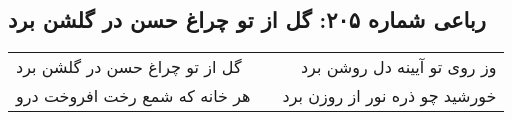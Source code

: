 \begin{center}
\section*{رباعی شماره ۲۰۵: گل از تو چراغ حسن در گلشن برد}
\label{sec:sh205}
\begin{longtable}{l p{0.5cm} r}
گل از تو چراغ حسن در گلشن برد
&&
وز روی تو آیینه دل روشن برد
\\
هر خانه که شمع رخت افروخت درو
&&
خورشید چو ذره نور از روزن برد
\\
\end{longtable}
\end{center}
